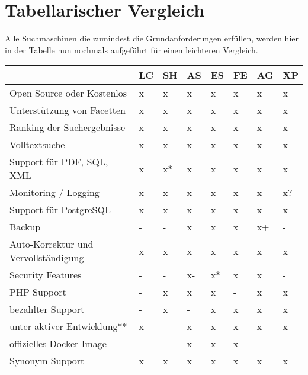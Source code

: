 \section {Tabellarischer Vergleich}

Alle Suchmaschinen die zumindest die Grundanforderungen erfüllen, werden hier in der Tabelle nun nochmals aufgeführt für einen leichteren Vergleich. 

\begin{table} %
	\centering
		\begin{tabular}{l | l | l | l | l | l | l | l}
		& \textbf{LC} & \textbf{SH} & \textbf{AS} & \textbf{ES}  & \textbf{FE} & \textbf{AG} & \textbf{XP} \\
        \hline
        Open Source oder Kostenlos                  & x & x  & x & x  & x & x  & x  \\
        Unterstützung von Facetten                  & x & x  & x & x  & x & x  & x  \\
        Ranking der Suchergebnisse                  & x & x  & x & x  & x & x  & x  \\
        Volltextsuche                               & x & x  & x & x  & x & x  & x  \\
        Support für PDF, SQL, XML                   & x & x* & x & x  & x & x  & x  \\
        Monitoring / Logging                        & x & x  & x & x  & x & x  & x? \\
        \hline
        Support für PostgreSQL                      & x & x  & x  & x  & x & x  & x \\
        Backup                                      & - & -  & x  & x  & x & x+ & - \\
        Auto-Korrektur und Vervollständigung        & x & x  & x  & x  & x & x  & x \\
        Security Features                           & - & -  & x- & x* & x & x  & - \\
        PHP Support                                 & - & x  & x  & x  & - & x  & x \\
        bezahlter Support                           & - & x  & -  & x  & x & x  & x \\
        \hline
        unter aktiver Entwicklung**                 & x & -  & x  & x  & x & x  & x \\
        offizielles Docker Image                    & - & -  & x  & x  & x & -  & - \\
        Synonym Support                             & x & x  & x  & x  & x & x  & x \\

\end{tabular}
\end{table}

